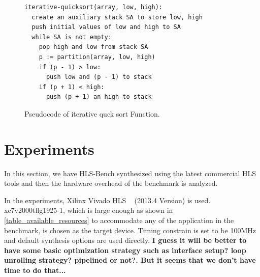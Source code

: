 \documentclass[conference]{IEEEtran}
\begin{document}
\begin{figure}[htb]\centering
{\fontsize{8}{8}\selectfont
\begin{lstlisting}[frame=lines]
iterative-quicksort(array, low, high):
  create an auxiliary stack SA to store low, high
  push initial values of low and high to SA
  while SA is not empty:
    pop high and low from stack SA
    p := partition(array, low, high)
    if (p - 1) > low:
      push low and (p - 1) to stack
    if (p + 1) < high:
      push (p + 1) an high to stack
\end{lstlisting}
}
\caption{Pseudocode of iterative quck sort Function.}\label{figure_qsort_iterative}
\end{figure}

%
%
%

\section{Experiments}\label{section_experiment}
In this section, we have HLS-Bench synthesized using the latest commercial HLS tools and then the hardware overhead of the benchmark is analyzed.

In the experiments, Xilinx Vivado HLS ~\cite{feist2012vivado} (2013.4 Version) is used. xc7v2000tflg1925-1, which is large enough as shown in \ref{table_available_resources} to accommodate any of the application in the benchmark, is chosen as the target device. Timing constrain is set to be 100MHz and default synthesis options are used directly. \textbf{I guess it will be better to have some basic optimization strategy such as interface setup? loop unrolling strategy? pipelined or not?. But it seems that we don't have time to do that...}
\end{document}
